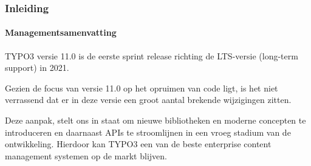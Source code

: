 %

\begin{frame}[fragile]
	\frametitle{Inleiding}
	\framesubtitle{Managementsamenvatting}

	\small
		TYPO3 versie 11.0 is de eerste sprint release richting de LTS-versie
		(long-term support) in 2021.

		\vspace{0.2cm}

		Gezien de focus van versie 11.0 op het opruimen van code ligt, is het niet
		verrassend dat er in deze versie een groot aantal brekende wijzigingen zitten.

		\vspace{0.2cm}

		Deze aanpak, stelt ons in staat om nieuwe bibliotheken en moderne concepten te
		introduceren en daarnaast APIs te stroomlijnen in een vroeg stadium van de
		ontwikkeling. Hierdoor kan TYPO3 een van de beste enterprise content management
		systemen op de markt blijven.

		\vspace{0.2cm}

	\normalsize

\end{frame}

